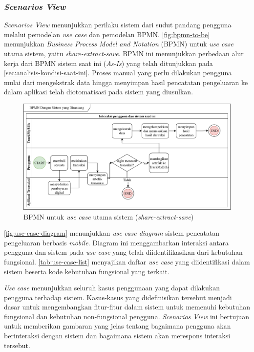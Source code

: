 \subsubsection{\emph{Scenarios View}}
\label{subsubsec:use-case-view}

\emph{Scenarios View} menunjukkan perilaku sistem dari sudut pandang pengguna melalui pemodelan \emph{use case} dan pemodelan BPMN. \autoref{fig:bpmn-to-be} menunjukkan \emph{Business Process Model and Notation} (BPMN) untuk \emph{use case} utama sistem, yaitu \emph{share-extract-save}. BPMN ini menunjukkan perbedaan alur kerja dari BPMN sistem saat ini (\emph{As-Is}) yang telah ditunjukkan pada \autoref{sec:analisis-kondisi-saat-ini}. Proses manual yang perlu dilakukan pengguna mulai dari mengekstrak data hingga menyimpan hasil pencatatan pengeluaran ke dalam aplikasi telah diotomatisasi pada sistem yang diusulkan.

\begin{figure}[htbp]
    \centering
    \includegraphics[width=1\textwidth]{images/To-be.png}
    \caption{BPMN untuk \emph{use case} utama sistem (\emph{share-extract-save})}
    \label{fig:bpmn-to-be}
\end{figure}

\autoref{fig:use-case-diagram} menunjukkan \emph{use case diagram} sistem pencatatan pengeluaran berbasis \emph{mobile}. Diagram ini menggambarkan interaksi antara pengguna dan sistem pada \emph{use case} yang telah diidentifikasikan dari kebutuhan fungsional. \autoref{tab:use-case-list} menyajikan daftar \emph{use case} yang diidentifikasi dalam sistem beserta kode kebutuhan fungsional yang terkait. 

\emph{Use case} menunjukkan seluruh kasus penggunaan yang dapat dilakukan pengguna terhadap sistem. Kasus-kasus yang didefinisikan tersebut menjadi dasar untuk mengembangkan fitur-fitur dalam sistem untuk memenuhi kebutuhan fungsional dan kebutuhan non-fungsional pengguna. \emph{Scenarios View} ini bertujuan untuk memberikan gambaran yang jelas tentang bagaimana pengguna akan berinteraksi dengan sistem dan bagaimana sistem akan merespons interaksi tersebut.

